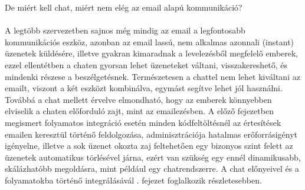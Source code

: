 De miért kell chat, miért nem elég az email alapú kommunikáció?\\
\hfill\\
A legtöbb szervezetben sajnos még mindig az email a legfontosabb kommunikációs eszköz, azonban az email lassú, nem alkalmas azonnali (instant) üzenetek küldésére, illetve gyakran kimaradnak a levelezésből megfelelő emberek, ezzel ellentétben a chaten gyorsan lehet üzeneteket váltani, visszakereshető, és mindenki részese a beszélgetésnek. Természetesen a chattel nem lehet kiváltani az emailt, viszont a két eszközt kombinálva, egymást segítve lehet jól használni.
Továbbá a chat mellett érvelve elmondható, hogy az emberek könnyebben elviselik a chaten előforduló zajt, mint az emailezésben. A előző fejezetben megismert folyamatos integráció esetén minden kódfeltöltésnél az értesítések emailen keresztül történő feldolgozása, adminisztrációja hatalmas erőforrásigényt igényelne, illetve a sok üzenet okozta zaj feltehetően egy bizonyos szint felett az üzenetek automatikus törlésével járna, ezért van szükség egy ennél dinamikusabb, skálázhatóbb megoldásra, mint például egy chatrendszerre. A chat előnyeivel és a folyamatokba történő integrálásávál . fejezet foglalkozik részletesebben.

